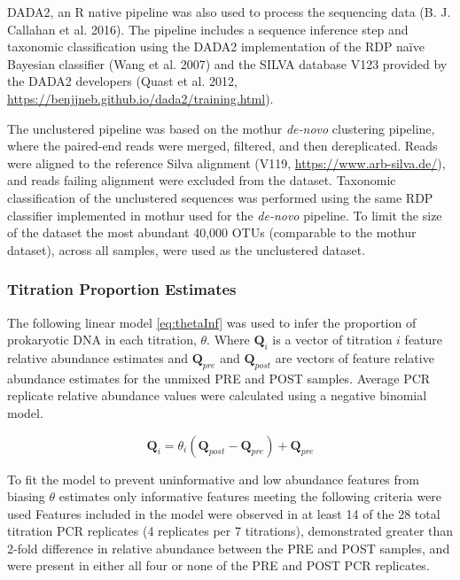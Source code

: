 \documentclass[smallextended]{svjour3}       %
\begin{document}
DADA2, an R native pipeline was also used to process the sequencing data
(B. J. Callahan et al. 2016). The pipeline includes a sequence inference
step and taxonomic classification using the DADA2 implementation of the
RDP naïve Bayesian classifier (Wang et al. 2007) and the SILVA database
V123 provided by the DADA2 developers (Quast et al. 2012,
\url{https://benjjneb.github.io/dada2/training.html}).

The unclustered pipeline was based on the mothur \emph{de-novo}
clustering pipeline, where the paired-end reads were merged, filtered,
and then dereplicated. Reads were aligned to the reference Silva
alignment (V119, \url{https://www.arb-silva.de/}), and reads failing
alignment were excluded from the dataset. Taxonomic classification of
the unclustered sequences was performed using the same RDP classifier
implemented in mothur used for the \emph{de-novo} pipeline. To limit the
size of the dataset the most abundant 40,000 OTUs (comparable to the
mothur dataset), across all samples, were used as the unclustered
dataset.

\hypertarget{titration-proportion-estimates}{%
\subsubsection{Titration Proportion
Estimates}\label{titration-proportion-estimates}}

The following linear model \eqref{eq:thetaInf} was used to infer the
proportion of prokaryotic DNA in each titration, \(\theta\). Where
\(\textbf{Q}_{i}\) is a vector of titration \(i\) feature relative
abundance estimates and \(\textbf{Q}_{pre}\) and \(\textbf{Q}_{post}\)
are vectors of feature relative abundance estimates for the unmixed PRE
and POST samples. Average PCR replicate relative abundance values were
calculated using a negative binomial model.

\begin{equation}
  \textbf{Q}_{i} = \theta_i (\textbf{Q}_{post} -\textbf{Q}_{pre}) + \textbf{Q}_{pre}
  \label{eq:thetaInf}
\end{equation}

To fit the model to prevent uninformative and low abundance features
from biasing \(\theta\) estimates only informative features meeting the
following criteria were used Features included in the model were
observed in at least 14 of the 28 total titration PCR replicates (4
replicates per 7 titrations), demonstrated greater than 2-fold
difference in relative abundance between the PRE and POST samples, and
were present in either all four or none of the PRE and POST PCR
replicates.
\end{document}
